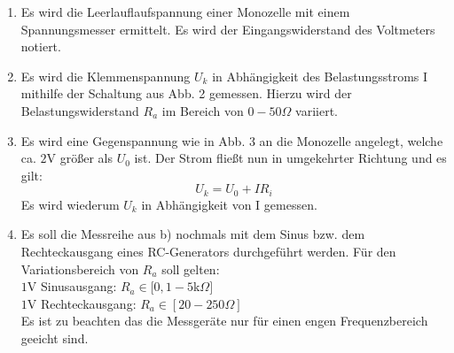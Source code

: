 \begin{enumerate}
    \item Es wird die Leerlauflaufspannung einer Monozelle mit einem Spannungsmesser ermittelt.
    Es wird der Eingangswiderstand des Voltmeters notiert.

    \item Es wird die Klemmenspannung $U_k$ in Abhängigkeit des Belastungsstroms I mithilfe
    der Schaltung aus Abb. 2 gemessen.
    Hierzu wird der Belastungswiderstand $R_a$ im Bereich von $ 0-50\Omega$ variiert.

    \item Es wird eine Gegenspannung wie in Abb. 3 an die Monozelle angelegt, welche ca. $2$V
    größer als $U_0$ ist. Der Strom fließt nun in umgekehrter Richtung und es gilt:
    \begin{equation}
	    U_k = U_0 + IR_i
    \end{equation}
    Es wird wiederum $U_k$ in Abhängigkeit von I gemessen.

    \item Es soll die Messreihe aus b) nochmals mit dem Sinus bzw. dem
    Rechteckausgang eines RC-Generators durchgeführt werden. Für den Variationsbereich
    von $R_a$ soll gelten:\\
    $1$V Sinusausgang: $R_a \in [0,1 - 5 $k$\Omega]$\\
    $1$V Rechteckausgang: $R_a \in [20 -250\Omega]$\\
    Es ist zu beachten das die Messgeräte nur für einen engen Frequenzbereich geeicht sind.
\end{enumerate}
